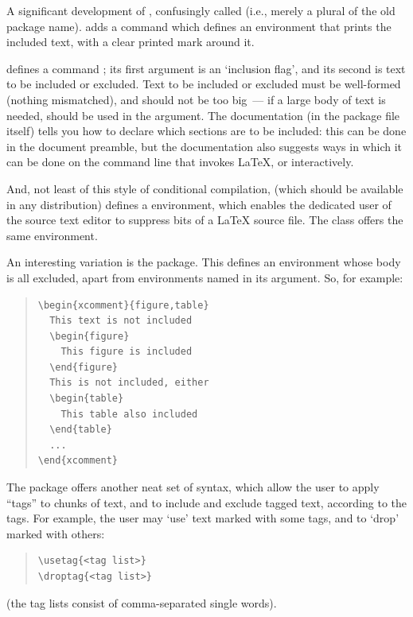 A significant development of , confusingly called
 (i.e., merely a plural of the old package name).
 adds a command
 which defines an environment
that prints the included text, with a clear printed mark around it.

 defines a command ; its first argument is
an `inclusion flag', and its second is text to be included or
excluded.  Text to be included or excluded must be well-formed
(nothing mismatched), and should not be too big~--- if a large body of
text is needed,  should be used in the argument.
The documentation (in the package file itself) tells you
how to declare which sections are to be included: this can be done in
the document preamble, but the documentation also suggests ways in
which it can be done on the command line that invokes \LaTeX{}, or
interactively.

And, not least of this style of conditional compilation,
 (which should be available in any distribution)
defines a  environment, which enables the
dedicated user of the source text editor to suppress bits of a
\LaTeX{} source file.  The  class offers the same
environment.

An interesting variation is the  package.  This
defines an environment whose body is all excluded, apart from
environments named in its argument.  So, for example:
\begin{quote}
\begin{verbatim}
\begin{xcomment}{figure,table}
  This text is not included
  \begin{figure}
    This figure is included
  \end{figure}
  This is not included, either
  \begin{table}
    This table also included
  \end{table}
  ...
\end{xcomment}
\end{verbatim}
\end{quote}

The  package offers another neat set of syntax, which
allow the user to apply ``tags'' to chunks of text, and to include and
exclude tagged text, according to the tags.  For example, the user may
`use' text marked with some tags, and to `drop' marked with others:
\begin{quote}
\begin{verbatim}
\usetag{<tag list>}
\droptag{<tag list>}
\end{verbatim}
\end{quote}
(the tag lists consist of comma-separated single words).

